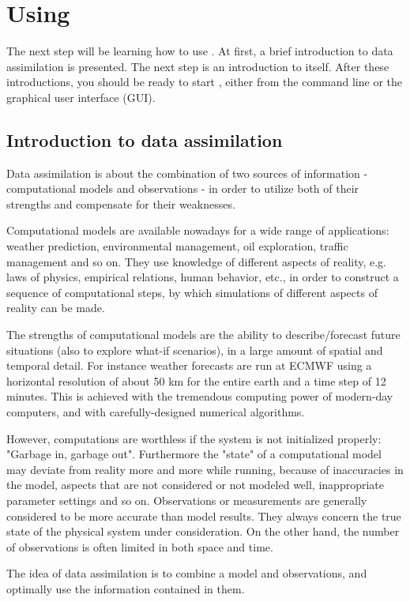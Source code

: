 \section{Using \oda}
The next step will be learning how to use \oda. At first, a brief introduction to data assimilation is presented. The next step is an introduction to \oda itself. After these introductions, you should be ready to start \oda, either from the command line or the graphical user interface (GUI). 

\subsection{Introduction to data assimilation}
Data assimilation is about the combination of two sources of information - computational models and observations - in order to utilize both of their strengths and compensate for their weaknesses.

Computational models are available nowadays for a wide range of applications: weather prediction, environmental management, oil exploration, traffic management and so on. They use knowledge of different aspects of reality, e.g. laws of physics, empirical relations, human behavior, etc., in order to construct a sequence of computational steps, by which simulations of different aspects of reality can be made.

The strengths of computational models are the ability to describe/forecast future situations (also to explore what-if scenarios), in a large amount of spatial and temporal detail. For instance weather forecasts are run at ECMWF using a horizontal resolution of about 50 km for the entire earth and a time step of 12 minutes. This is achieved with the tremendous computing power of modern-day computers, and with carefully-designed numerical algorithms.

However, computations are worthless if the system is not initialized properly: "Garbage in, garbage out". Furthermore the "state" of a computational model may deviate from reality more and more while running, because of inaccuracies in the model, aspects that are not considered or not modeled well, inappropriate parameter settings and so on. Observations or measurements are generally considered to be more accurate than model results. They always concern the true state of the physical system under consideration. On the other hand, the number of observations is often limited in both space and time.

The idea of data assimilation is to combine a model and observations, and optimally use the information contained in them.

